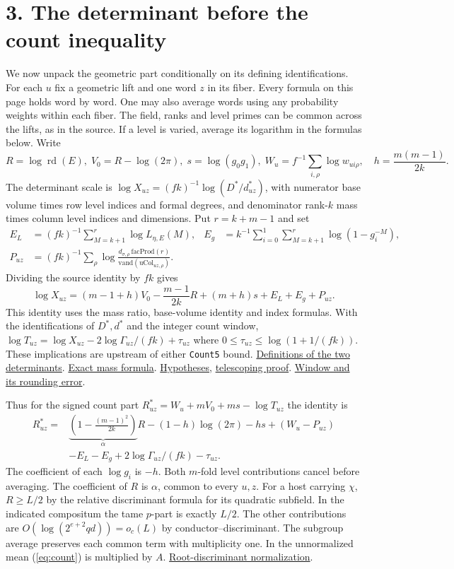 \documentclass[11pt]{article}
\newcommand{\base}{https://github.com/Deicyde/riemann-hypothesis/blob/e7c8972c701d3396947808ab20cc16dc14623d33/src/}
\newcommand{\pin}[3]{\href{\base#1.lean\##2}{#3}}
\newcommand{\schur}{Formalism/SharpRestriction/GlobalSchurBounds/}
\newcommand{\rd}{\operatorname{rd}}
\begin{document}
\section*{3. The determinant before the count inequality}
We now unpack the geometric part conditionally on its defining identifications. For each $u$ fix a geometric lift and one word $z$ in its fiber. Every formula on this page holds word by word. One may also average words using any probability weights within each fiber. The field, ranks and level primes can be common across the lifts, as in the source. If a level is varied, average its logarithm in the formulas below. Write
\[
 R=\log\rd(E),\; V_0=R-\log(2\pi),\;
 s=\log(g_0g_1),\; W_u=f^{-1}\sum_{i,\rho}\log w_{ui\rho},
 \quad h=\frac{m(m-1)}{2k}.
\]
The determinant scale is $\log X_{uz}=(fk)^{-1}\log(D^*/d^*_{uz})$, with numerator base volume times row level indices and formal degrees, and denominator rank-$k$ mass times column level indices and dimensions. Put $r=k+m-1$ and set
\begin{align*}
 E_L&=(fk)^{-1}\sum_{M=k+1}^{r}\log L_{\eta,E}(M),&
 E_g&=k^{-1}\sum_{i=0}^1\sum_{M=k+1}^{r}\log(1-g_i^{-M}),\\
 P_{uz}&=(fk)^{-1}\sum_{\rho}\log\!
     \frac{d_{\sigma,\rho}\,\mathrm{facProd}(r)}
          {\mathrm{vand}(\mathrm{uCol}_{uz,\rho})}.&&
\end{align*}
Dividing the source identity by $fk$ gives
\[
 \log X_{uz}=(m-1+h)V_0-\frac{m-1}{2k}R+(m+h)s+E_L+E_g+P_{uz}.
\]
This identity uses the mass ratio, base-volume identity and index formulas. With the identifications of $D^*,d^*$ and the integer count window,
$\log T_{uz}=\log X_{uz}-2\log\Gamma_{uz}/(fk)+\tau_{uz}$ where
$0\le\tau_{uz}\le\log(1+1/(fk))$.
These implications are upstream of either \texttt{Count5} bound.
\pin{\schur GeneralLinearActions/GapAtLeast}{L82-L99}{Definitions of the two determinants}.
\pin{\schur TheoremThreeOfExplicitAndCompact}{L126-L140}{Exact mass formula}.
\pin{\schur LinkMin}{L48-L60}{Hypotheses}, \pin{\schur LinkMin}{L143-L147}{telescoping proof}.
\pin{\schur JointsL}{L59-L83}{Window and its rounding error}.

Thus for the signed count part $R^*_{uz}=W_u+mV_0+ms-\log T_{uz}$ the identity is
\begin{equation}
 \begin{split}
 R^*_{uz}={}&\underbrace{\left(1-\frac{(m-1)^2}{2k}\right)}_{\alpha}R
 -(1-h)\log(2\pi)-hs+(W_u-P_{uz})\\
 &-E_L-E_g+2\log\Gamma_{uz}/(fk)-\tau_{uz}.
 \end{split}\label{eq:count}
\end{equation}
The coefficient of each $\log g_i$ is $-h$. Both $m$-fold level contributions cancel before averaging. The coefficient of $R$ is $\alpha$, common to every $u,z$. For a host carrying $\chi$, $R\ge L/2$ by the relative discriminant formula for its quadratic subfield. In the indicated compositum the tame $p$-part is exactly $L/2$. The other contributions are $O(\log(2^{e+2}qd))=o_c(L)$ by conductor--discriminant. The subgroup average preserves each common term with multiplicity one. In the unnormalized mean (\ref{eq:count}) is multiplied by $A$.
\pin{Formalism/LocalRingCardinality/DataHost}{L140-L145}{Root-discriminant normalization}.
\end{document}
